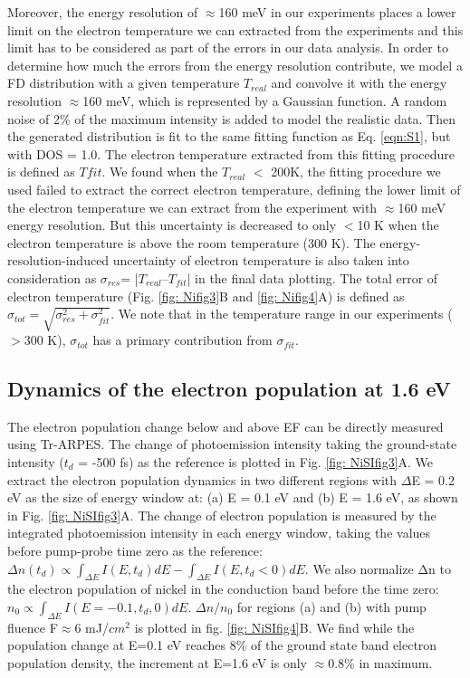 Moreover, the energy resolution of $\approx$160 meV in our experiments places a lower limit on the electron temperature we can extracted from the experiments and this limit has to be considered as part of the errors in our data analysis. In order to determine how much the errors from the energy resolution contribute, we model a FD distribution with a given temperature $T_{real}$ and convolve it with the energy resolution $\approx$160 meV, which is represented by a Gaussian function. A random noise of 2\% of the maximum intensity is added to model the realistic data. Then the generated distribution is fit to the same fitting function as Eq. \ref{eqn:S1}, but with DOS = 1.0. The electron temperature extracted from this fitting procedure is defined as $T{fit}$. We found when the $T_{real}$ $<$ 200K, the fitting procedure we used failed to extract the correct electron temperature, defining the lower limit of the electron temperature we can extract from the experiment with $\approx$160 meV energy resolution. But this uncertainty is decreased to only $<$10 K when the electron temperature is above the room temperature (300 K). The energy-resolution-induced uncertainty of electron temperature is also taken into consideration as $\sigma_{res}$= |$T_{real} – T_{fit}$| in the final data plotting. The total error of electron temperature (Fig. \ref{fig: Nifig3}B and \ref{fig: Nifig4}A) is defined as $\sigma_{tot}=\sqrt{\sigma_{res}^2+\sigma_{fit}^2}$. We note that in the temperature range in our experiments ($>$300 K), $\sigma_{tot}$ has a primary contribution from $\sigma_{fit}$.

\subsection{Dynamics of the electron population at 1.6 eV}
The electron population change below and above EF can be directly measured using Tr-ARPES. The change of photoemission intensity taking the ground-state intensity ($t_{d}$ = -500 fs) as the reference is plotted in Fig. \ref{fig: NiSIfig3}A. We extract the electron population dynamics in two different regions with $\Delta$E = 0.2 eV as the size of energy window at: (a) E = 0.1 eV and (b) E = 1.6 eV, as shown in Fig. \ref{fig: NiSIfig3}A. The change of electron population is measured by the integrated photoemission intensity in each energy window, taking the values before pump-probe time zero as the reference:$\Delta n(t_d)\propto\int_{\Delta E}I(E,t_d)dE-\int_{\Delta E}I(E,t_d<0)dE$. We also normalize Δn to the electron population of nickel in the conduction band before the time zero: $n_0\propto \int_{\Delta E} I(E=-0.1,t_d,0)dE$. $\Delta n/n_0$ for regions (a) and (b) with pump fluence F$\approx$6 mJ/$cm^2$ is plotted in fig. \ref{fig: NiSIfig4}B. We find while the population change at E=0.1 eV reaches 8\% of the ground state band electron population density, the increment at E=1.6 eV is only $\approx$0.8\% in maximum.

